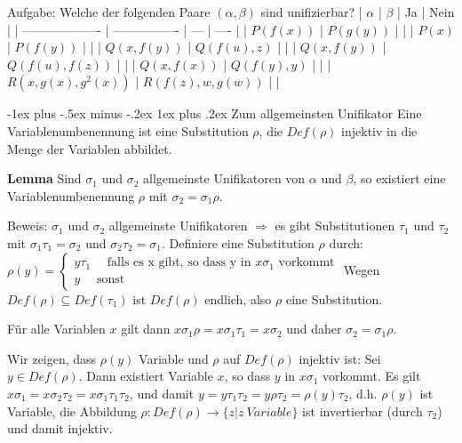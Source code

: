 \documentclass[a4paper]{article}
\makeatletter
\renewcommand{\note}[2]{\begin{noteBox} \textbf{#1} #2 \end{noteBox}}
\renewcommand{\subsubsection}{\@startsection{subsubsection}{3}{0mm}%
                {-1ex plus -.5ex minus -.2ex}%
                {1ex plus .2ex}%
                {\normalfont\small\bfseries}}
\makeatother
\begin{document}
\begin{multicols}{3}
  Aufgabe: Welche der folgenden Paare $(\alpha,\beta)$ sind unifizierbar?
  | $\alpha$            | $\beta$          | Ja  | Nein |
  | ------------------- | ---------------- | --- | ---- |
  | $P(f(x))$           | $P(g(y))$        |     |
  | $P(x)$              | $P(f(y))$        |     |
  | $Q(x,f(y))$         | $Q(f(u),z)$      |     |
  | $Q(x,f(y))$         | $Q(f(u),f(z))$   |     |
  | $Q(x,f(x))$         | $Q(f(y),y)$      |     |
  | $R(x,g(x),g^2 (x))$ | $R(f(z),w,g(w))$ |     |

  \subsubsection{Zum allgemeinsten Unifikator}
  Eine Variablenumbenennung ist eine Substitution $\rho$, die $Def(\rho)$ injektiv in die Menge der Variablen abbildet.

  \note{Lemma}{Sind $\sigma_1$ und $\sigma_2$ allgemeinste Unifikatoren von $\alpha$ und $\beta$, so existiert eine Variablenumbenennung $\rho$ mit $\sigma_2=\sigma_1 \rho$.}

  Beweis: $\sigma_1$ und $\sigma_2$ allgemeinste Unifikatoren $\Rightarrow$ es gibt Substitutionen $\tau_1$ und $\tau_2$ mit $\sigma_1\tau_1 =\sigma_2$ und $\sigma_2\tau_2 =\sigma_1$.
  Definiere eine Substitution $\rho$ durch:
  $\rho(y) =\begin{cases} y\tau_1 \quad\text{ falls es x gibt, so dass y in } x\sigma_1 \text{ vorkommt}\\ y \quad\text{ sonst }\end{cases}$
  Wegen $Def(\rho)\subseteq Def(\tau_1)$ ist $Def(\rho)$ endlich, also $\rho$ eine Substitution.
  \begin{itemize*}
    \item Für alle Variablen $x$ gilt dann $x\sigma_1 \rho=x\sigma_1 \tau_1 =x\sigma_2$ und daher $\sigma_2 =\sigma_1 \rho$.
    \item Wir zeigen, dass $\rho(y)$ Variable und $\rho$ auf $Def(\rho)$ injektiv ist: Sei $y\in Def(\rho)$. Dann existiert Variable $x$, so dass $y$ in $x\sigma_1$ vorkommt. Es gilt $x\sigma_1 =x\sigma_2\tau_2=x\sigma_1\tau_1\tau_2$, und damit $y=y\tau_1 \tau_2 =y\rho \tau_2 =\rho(y)\tau_2$, d.h. $\rho(y)$ ist Variable, die Abbildung $\rho:Def(\rho)\rightarrow\{z|z\ Variable\}$ ist invertierbar (durch $\tau_2$) und damit injektiv.
  \end{itemize*}


\end{multicols}
\end{document}
